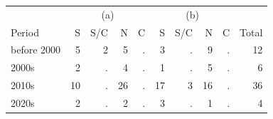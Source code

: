 \begin{center}\small
\begin{tabular}{@{}lrrrrrrrrr@{}}\toprule
 & \multicolumn{4}{c}{(a)} & \multicolumn{4}{c}{(b)} & \\
Period & S & S/C & N & C & S & S/C & N & C & Total \\ \midrule
before 2000 & 5 & 2 & 5 & . & 3 & . & 9 & . & 12 \\
2000s & 2 & . & 4 & . & 1 & . & 5 & . & 6 \\
2010s & 10 & . & 26 & . & 17 & 3 & 16 & . & 36 \\
2020s & 2 & . & 2 & . & 3 & . & 1 & . & 4 \\
\bottomrule\end{tabular}\end{center}
